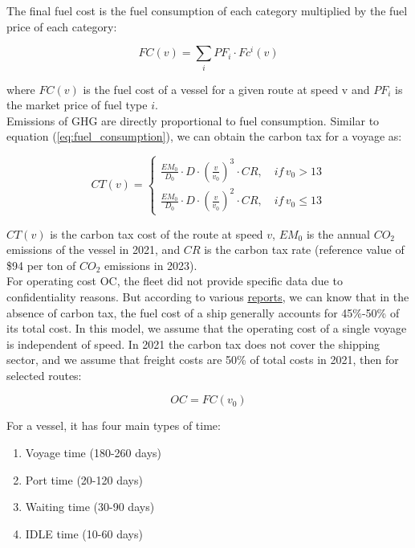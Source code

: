 \documentclass[a4paper,12pt]{article}
\begin{document}
The final fuel cost is the fuel consumption of each category multiplied by the fuel price of each category:

\begin{equation}
	\label{eq:fuel_cost}
	FC(v) = \sum_i PF_i \cdot Fc^i(v)
\end{equation}

where $FC(v)$ is the fuel cost of a vessel for a given route at speed v and $PF_i$ is the market price of fuel type $i$.\\

Emissions of GHG are directly proportional to fuel consumption.
Similar to equation (\ref{eq:fuel_consumption}), we can obtain the carbon tax for a voyage as:

\begin{equation}
	\label{eq:emission}
	CT(v) =
	\left\{
	\begin{aligned}
		\frac{EM_0}{D_0} \cdot D \cdot (\frac{v}{v_0})^3 \cdot CR, \quad if \, v_0 > 13 \\
		\frac{EM_0}{D_0} \cdot D \cdot (\frac{v}{v_0})^2 \cdot CR, \quad if \, v_0 \leq 13
	\end{aligned}
	\right.
\end{equation}

$CT(v)$ is the carbon tax cost of the route at speed $v$, $EM_0$ is the annual $CO_2$ emissions of the vessel in 2021, and $CR$ is the carbon tax rate (reference value of \$94 per ton of $CO_2$ emissions in 2023).\\

For operating cost OC, the fleet did not provide specific data due to confidentiality reasons.
But according to various \href{https://transportgeography.org/contents/chapter5/maritime-transportation/containerships-operating-costs-panamax-post-panamax/}{reports}, we can know that in the absence of carbon tax, the fuel cost of a ship generally accounts for 45\%-50\% of its total cost.
In this model, we assume that the operating cost of a single voyage is independent of speed.
In 2021 the carbon tax does not cover the shipping sector, and we assume that freight costs are 50\% of total costs in 2021, then for selected routes:

\begin{equation}
	\label{eq:operation_cost}
	OC = FC(v_0)
\end{equation}

For a vessel, it has four main types of time:
\begin{enumerate}
	\item Voyage time (180-260 days)
	\item Port time (20-120 days)
	\item Waiting time (30-90 days)
	\item IDLE time (10-60 days)
\end{enumerate}
\end{document}
